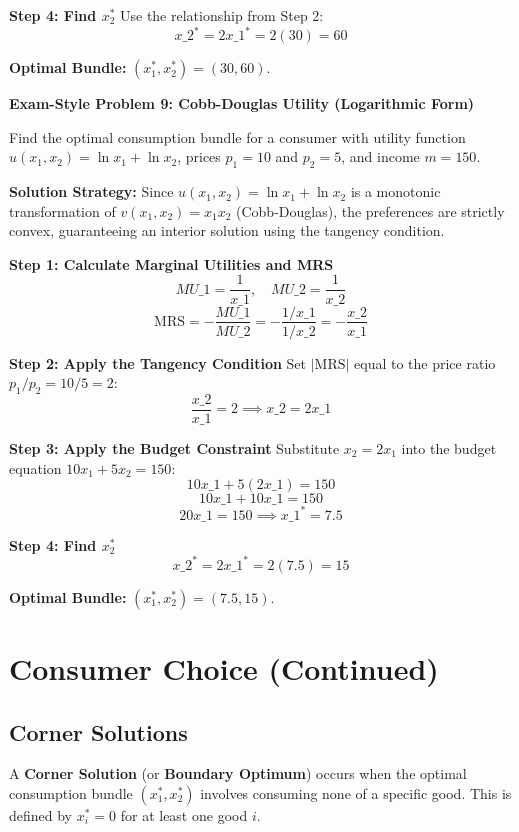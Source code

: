 \documentclass{article}
\begin{document}
\textbf{Step 4: Find $x_2^*$}
Use the relationship from Step 2:
\[ x\_2^* = 2x\_1^* = 2(30) = 60 \]

\textbf{Optimal Bundle:} $(x_1^*, x_2^*) = (30, 60)$.

\vspace{0.5em}

\vspace{0.5em}

\noindent\textbf{Exam-Style Problem 9: Cobb-Douglas Utility (Logarithmic Form)}

Find the optimal consumption bundle for a consumer with utility function $u(x_1, x_2) = \ln x_1 + \ln x_2$, prices $p_1=10$ and $p_2=5$, and income $m=150$.

\textbf{Solution Strategy:} Since $u(x_1, x_2) = \ln x_1 + \ln x_2$ is a monotonic transformation of $v(x_1, x_2) = x_1 x_2$ (Cobb-Douglas), the preferences are strictly convex, guaranteeing an interior solution using the tangency condition.

\textbf{Step 1: Calculate Marginal Utilities and MRS}
\[ MU\_1 = \frac{1}{x\_1}, \quad MU\_2 = \frac{1}{x\_2} \]
\[ \text{MRS} = -\frac{MU\_1}{MU\_2} = -\frac{1/x\_1}{1/x\_2} = -\frac{x\_2}{x\_1} \]

\textbf{Step 2: Apply the Tangency Condition}
Set $|\text{MRS}|$ equal to the price ratio $p_1/p_2 = 10/5 = 2$:
\[ \frac{x\_2}{x\_1} = 2 \implies x\_2 = 2x\_1 \]

\textbf{Step 3: Apply the Budget Constraint}
Substitute $x_2 = 2x_1$ into the budget equation $10x_1 + 5x_2 = 150$:
\[ 10x\_1 + 5(2x\_1) = 150 \]
\[ 10x\_1 + 10x\_1 = 150 \]
\[ 20x\_1 = 150 \implies x\_1^* = 7.5 \]

\textbf{Step 4: Find $x_2^*$}
\[ x\_2^* = 2x\_1^* = 2(7.5) = 15 \]

\textbf{Optimal Bundle:} $(x_1^*, x_2^*) = (7.5, 15)$.

\section{Consumer Choice (Continued)}

\subsection{Corner Solutions}

A \textbf{Corner Solution} (or \textbf{Boundary Optimum}) occurs when the optimal consumption bundle $(x_1^*, x_2^*)$ involves consuming none of a specific good. This is defined by $x_i^* = 0$ for at least one good $i$.
\end{document}
